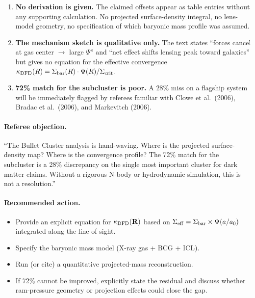 \begin{enumerate}
\item \textbf{No derivation is given.}  The claimed offsets appear as
  table entries without any supporting calculation.  No projected
  surface-density integral, no lens-model geometry, no specification of
  which baryonic mass profile was assumed.
\item \textbf{The mechanism sketch is qualitative only.}  The text states
  ``forces cancel at gas center $\to$ large $\Psi$'' and ``net effect
  shifts lensing peak toward galaxies'' but gives no equation for the
  effective convergence $\kappa_{\rm DFD}(R) = \Sigma_{\rm bar}(R) \cdot
  \Psi(R) / \Sigma_{\rm crit}$.
\item \textbf{72\% match for the subcluster is poor.}  A 28\% miss on
  a flagship system will be immediately flagged by referees familiar
  with Clowe et al.\ (2006), Bradac et al.\ (2006), and Markevitch
  (2006).
\end{enumerate}

\paragraph{Referee objection.}
``The Bullet Cluster analysis is hand-waving.  Where is the projected
surface-density map?  Where is the convergence profile?  The 72\% match
for the subcluster is a 28\% discrepancy on the single most important
cluster for dark matter claims.  Without a rigorous N-body or
hydrodynamic simulation, this is not a resolution.''

\paragraph{Recommended action.}
\begin{itemize}
\item Provide an explicit equation for $\kappa_{\rm DFD}(\mathbf{R})$
  based on $\Sigma_{\rm eff} = \Sigma_{\rm bar} \times \Psi(a/a_0)$
  integrated along the line of sight.
\item Specify the baryonic mass model (X-ray gas + BCG + ICL).
\item Run (or cite) a quantitative projected-mass reconstruction.
\item If 72\% cannot be improved, explicitly state the residual and
  discuss whether ram-pressure geometry or projection effects could
  close the gap.
\end{itemize}

